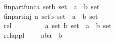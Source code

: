 \begin{isabellebody}
\isanewline
fin{\isacharunderscore}part{\isacharunderscore}func{\isacharcolon}{\isacharcolon}{\isachardoublequoteopen}{\isacharbrackleft}{\isacharprime}a\ set{\isacharcomma}{\isacharprime}b\ set{\isacharbrackright}\ {\isacharequal}{\isachargreater}\ {\isacharparenleft}{\isacharprime}a\ {\isacharless}{\isacharequal}{\isachargreater}\ {\isacharprime}b{\isacharparenright}\ set{\isachardoublequoteclose}\ \ \ \ \ {\isacharparenleft}{\isachardoublequoteopen}{\isacharunderscore}\ {\isacharminus}{\isacharbar}{\isacharbar}{\isacharminus}{\isachargreater}\ {\isacharunderscore}{\isachardoublequoteclose}\ \ {\isacharbrackleft}{}{}{\isacharcomma}{}{}{\isacharbrackright}\ {}{}{\isacharparenright}\isanewline
\isanewline
fin{\isacharunderscore}part{\isacharunderscore}inj\ {\isacharcolon}{\isacharcolon}{\isachardoublequoteopen}{\isacharbrackleft}{\isacharprime}a\ set{\isacharcomma}{\isacharprime}b\ set{\isacharbrackright}\ {\isacharequal}{\isachargreater}\ {\isacharparenleft}{\isacharprime}a\ {\isacharless}{\isacharequal}{\isachargreater}\ {\isacharprime}b{\isacharparenright}\ set{\isachardoublequoteclose}\ \ \ \ \ {\isacharparenleft}{\isachardoublequoteopen}{\isacharunderscore}\ {\isachargreater}{\isacharminus}{\isacharbar}{\isacharbar}{\isacharminus}{\isachargreater}\ {\isacharunderscore}{\isachardoublequoteclose}\ {\isacharbrackleft}{}{}{\isacharcomma}{}{}{\isacharbrackright}\ {}{}{\isacharparenright}\isanewline
\isanewline
rel\ \ \ \ \ \ \ \ \ \ {\isacharcolon}{\isacharcolon}{\isachardoublequoteopen}{\isacharbrackleft}{\isacharprime}a\ set{\isacharcomma}\ {\isacharprime}b\ set{\isacharbrackright}\ {\isacharequal}{\isachargreater}\ {\isacharparenleft}{\isacharprime}a\ {\isacharless}{\isacharequal}{\isachargreater}\ {\isacharprime}b{\isacharparenright}\ set{\isachardoublequoteclose}\ \ \ \ {\isacharparenleft}{\isachardoublequoteopen}{\isacharunderscore}\ {\isacharless}{\isacharminus}{\isacharminus}{\isachargreater}\ {\isacharunderscore}{\isachardoublequoteclose}\ \ \ {\isacharbrackleft}{}{}{\isacharcomma}{}{}{\isacharbrackright}\ {}{}{\isacharparenright}\isanewline
rel{\isacharunderscore}appl\ \ \ \ \ {\isacharcolon}{\isacharcolon}{\isachardoublequoteopen}{\isacharbrackleft}{\isacharprime}a{\isacharless}{\isacharequal}{\isachargreater}{\isacharprime}b{\isacharcomma}{\isacharprime}a{\isacharbrackright}\ {\isacharequal}{\isachargreater}\ {\isacharprime}b{\isachardoublequoteclose}\ \ \ \ \ \ \ \ \ \ \ \ \ \ \ \ \ \ \ \ \ {\isacharparenleft}{\isachardoublequoteopen}{\isacharunderscore}\ {\isacharpercent}{\isacharcircum}\ {\isacharunderscore}{\isachardoublequoteclose}\ \ \ \ \ {\isacharbrackleft}{}{}{\isacharcomma}{}{}{\isacharbrackright}\ {}{}{\isacharparenright}\isanewline

\end{isabellebody}

